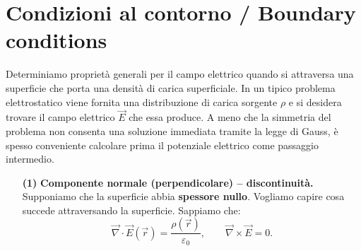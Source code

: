 \documentclass{book}
\begin{document}
\section{Condizioni al contorno / Boundary conditions}
Determiniamo proprietà generali per il campo elettrico quando si attraversa una superficie che porta una densità di carica superficiale.
In un tipico problema elettrostatico viene fornita una distribuzione di carica sorgente $\rho$ e si desidera trovare il campo elettrico $\vec{E}$ che essa produce. A meno che la simmetria del problema non consenta una soluzione immediata tramite la legge di Gauss, è spesso conveniente calcolare prima il potenziale elettrico come passaggio intermedio.

\begin{itemize}
\item[\textbf{(1)}] \textbf{Componente normale (perpendicolare) -- discontinuità.}\\
Supponiamo che la superficie abbia \textbf{spessore nullo}.
Vogliamo capire cosa succede attraversando la superficie. Sappiamo che:
$$
\vec{\nabla}\cdot\vec{E}(\vec{r}) = \frac{\rho(\vec{r})}{\varepsilon_0},
\qquad 
\vec{\nabla}\times \vec{E} = 0.
$$


\end{itemize}
\end{document}
